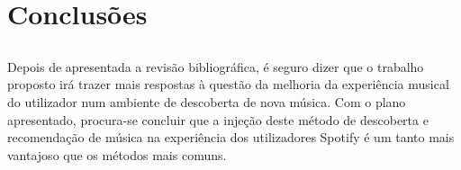 
\chapter{Conclusões} \label{chap:concl}

\section*{}

Depois de apresentada a revisão bibliográfica, é seguro dizer que o trabalho proposto irá trazer mais respostas à questão da melhoria da experiência musical do utilizador num ambiente de descoberta de nova música.
Com o plano apresentado, procura-se concluir que a injeção deste método de descoberta e recomendação de música na experiência dos utilizadores Spotify é um tanto mais vantajoso que os métodos mais comuns.